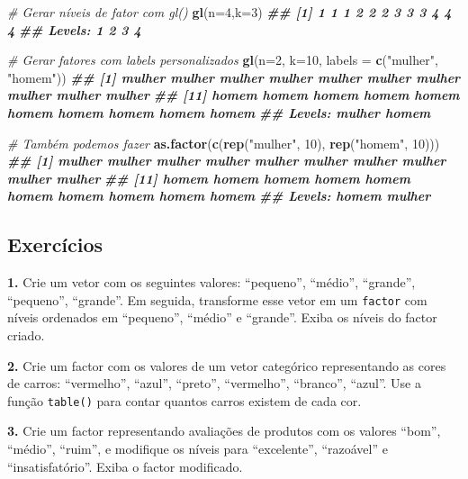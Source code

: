 \documentclass[
]{book}
\newenvironment{Shaded}{\begin{snugshade}}{\end{snugshade}}
\newcommand{\AttributeTok}[1]{\textcolor[rgb]{0.13,0.29,0.53}{#1}}
\newcommand{\CommentTok}[1]{\textcolor[rgb]{0.56,0.35,0.01}{\textit{#1}}}
\newcommand{\DecValTok}[1]{\textcolor[rgb]{0.00,0.00,0.81}{#1}}
\newcommand{\DocumentationTok}[1]{\textcolor[rgb]{0.56,0.35,0.01}{\textbf{\textit{#1}}}}
\newcommand{\FunctionTok}[1]{\textcolor[rgb]{0.13,0.29,0.53}{\textbf{#1}}}
\newcommand{\NormalTok}[1]{#1}
\newcommand{\StringTok}[1]{\textcolor[rgb]{0.31,0.60,0.02}{#1}}
\begin{document}
\begin{Shaded}
\begin{Highlighting}[]
\CommentTok{\# Gerar níveis de fator com gl()}
\FunctionTok{gl}\NormalTok{(}\AttributeTok{n=}\DecValTok{4}\NormalTok{,}\AttributeTok{k=}\DecValTok{3}\NormalTok{)}
\DocumentationTok{\#\#  [1] 1 1 1 2 2 2 3 3 3 4 4 4}
\DocumentationTok{\#\# Levels: 1 2 3 4}

\CommentTok{\# Gerar fatores com labels personalizados}
\FunctionTok{gl}\NormalTok{(}\AttributeTok{n=}\DecValTok{2}\NormalTok{, }\AttributeTok{k=}\DecValTok{10}\NormalTok{, }\AttributeTok{labels =} \FunctionTok{c}\NormalTok{(}\StringTok{"mulher"}\NormalTok{, }\StringTok{"homem"}\NormalTok{))}
\DocumentationTok{\#\#  [1] mulher mulher mulher mulher mulher mulher mulher mulher mulher mulher}
\DocumentationTok{\#\# [11] homem  homem  homem  homem  homem  homem  homem  homem  homem  homem }
\DocumentationTok{\#\# Levels: mulher homem}

\CommentTok{\# Também podemos fazer}
\FunctionTok{as.factor}\NormalTok{(}\FunctionTok{c}\NormalTok{(}\FunctionTok{rep}\NormalTok{(}\StringTok{"mulher"}\NormalTok{, }\DecValTok{10}\NormalTok{), }\FunctionTok{rep}\NormalTok{(}\StringTok{"homem"}\NormalTok{, }\DecValTok{10}\NormalTok{)))}
\DocumentationTok{\#\#  [1] mulher mulher mulher mulher mulher mulher mulher mulher mulher mulher}
\DocumentationTok{\#\# [11] homem  homem  homem  homem  homem  homem  homem  homem  homem  homem }
\DocumentationTok{\#\# Levels: homem mulher}
\end{Highlighting}
\end{Shaded}

\subsection{Exercícios}\label{exercuxedcios-2}

\textbf{1.} Crie um vetor com os seguintes valores: ``pequeno'', ``médio'',
``grande'', ``pequeno'', ``grande''. Em seguida, transforme esse vetor em um
\texttt{factor} com níveis ordenados em ``pequeno'', ``médio'' e ``grande''. Exiba os
níveis do factor criado.

\textbf{2.} Crie um factor com os valores de um vetor categórico
representando as cores de carros: ``vermelho'', ``azul'', ``preto'',
``vermelho'', ``branco'', ``azul''. Use a função \texttt{table()} para contar quantos
carros existem de cada cor.

\textbf{3.} Crie um factor representando avaliações de produtos com os
valores ``bom'', ``médio'', ``ruim'', e modifique os níveis para ``excelente'',
``razoável'' e ``insatisfatório''. Exiba o factor modificado.
\end{document}
